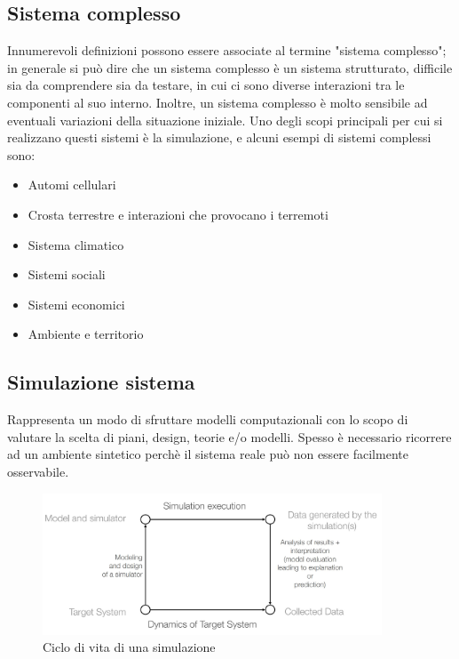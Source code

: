 \documentclass[12pt]{article}
\begin{document}
\newpage

\subsection{Sistema complesso}
Innumerevoli definizioni possono essere associate al termine "sistema complesso"; in generale si può dire che un sistema complesso è un sistema strutturato, difficile sia da comprendere sia da testare, in cui ci sono diverse interazioni tra le componenti al suo interno. Inoltre, un sistema complesso è molto sensibile ad eventuali variazioni della situazione iniziale. Uno degli scopi principali per cui si realizzano questi sistemi è la simulazione, e alcuni esempi di sistemi complessi sono: \cite{SistemaComplesso}
\begin{itemize}
\setlength\itemsep{0.1em}
\item Automi cellulari
\item Crosta terrestre e interazioni che provocano i terremoti
\item Sistema climatico
\item Sistemi sociali
\item Sistemi economici
\item Ambiente e territorio
\end{itemize}

\subsection{Simulazione sistema}
Rappresenta un modo di sfruttare modelli computazionali con lo scopo di valutare la scelta di piani, design, teorie e/o modelli. Spesso è necessario ricorrere ad un ambiente sintetico perchè il sistema reale può non essere facilmente osservabile.

\begin{figure}[ht]
\centering
\includegraphics[width=0.9\textwidth,height=\textheight,keepaspectratio]{Figures/Vario/Simulazione.jpg}
\caption[Ciclo di vita di una simulazione]{Ciclo di vita di una simulazione}
\label{fig:Simulazione}
\end{figure}
\end{document}
